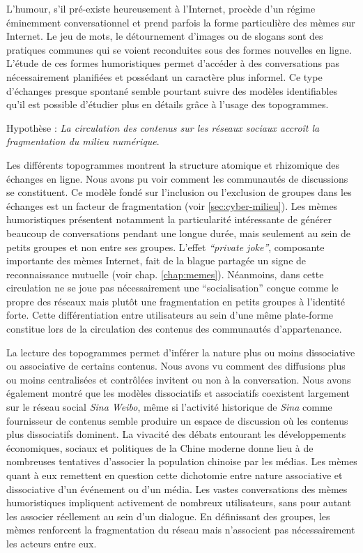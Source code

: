 L'humour, s'il pré-existe heureusement à l'Internet, procède d'un régime éminemment conversationnel et prend parfois la forme particulière des mèmes sur Internet. Le jeu de mots, le détournement d'images ou de slogans sont des pratiques communes qui se voient reconduites sous des formes nouvelles en ligne. L'étude de ces formes humoristiques permet d'accéder à des conversations pas nécessairement planifiées et possédant un caractère plus informel. Ce type d'échanges presque spontané semble pourtant suivre des modèles identifiables qu'il est possible d'étudier plus en détails grâce à l'usage des topogrammes. 

Hypothèse : \textit{La circulation des contenus sur les réseaux sociaux accroît la fragmentation du milieu numérique}.

Les différents topogrammes montrent la structure atomique et rhizomique des échanges en ligne. Nous avons pu voir comment les communautés de discussions se constituent. Ce modèle fondé sur l'inclusion ou l'exclusion de groupes dans les échanges est un facteur de fragmentation (voir \ref{sec:cyber-milieu}). Les mèmes humoristiques présentent notamment la particularité intéressante de générer beaucoup de conversations pendant une longue durée, mais seulement au sein de petits groupes et non entre ses groupes. L'effet \textit{``private joke''}, composante importante des mèmes Internet, fait de la blague partagée un signe de reconnaissance mutuelle (voir chap. \ref{chap:memes}). Néanmoins, dans cette circulation ne se joue pas nécessairement une ``socialisation'' conçue comme le propre des réseaux mais plutôt une fragmentation en petits groupes à l'identité forte. Cette différentiation entre utilisateurs au sein d'une même plate-forme constitue lors de la circulation des contenus des communautés d'appartenance.


La lecture des topogrammes permet d'inférer la nature plus ou moins dissociative ou associative de certains contenus. Nous avons vu comment des diffusions plus ou moins centralisées et contrôlées invitent ou non à la conversation. Nous avons également montré que les modèles dissociatifs et associatifs coexistent largement sur le réseau social \textit{Sina Weibo}, même si l'activité historique de \textit{Sina} comme fournisseur de contenus semble produire un espace de discussion où les contenus plus dissociatifs dominent. La vivacité des débats entourant les développements économiques, sociaux et politiques de la Chine moderne donne lieu à de nombreuses tentatives d{\textquoteright}associer la population chinoise par les médias. Les mèmes quant à eux remettent en question cette dichotomie entre nature associative et dissociative d'un événement ou d'un média. Les vastes conversations des mèmes humoristiques impliquent activement de nombreux utilisateurs, sans pour autant les associer réellement au sein d'un dialogue. En définissant des groupes, les mèmes renforcent la fragmentation du réseau mais n'associent pas nécessairement les acteurs entre eux.

